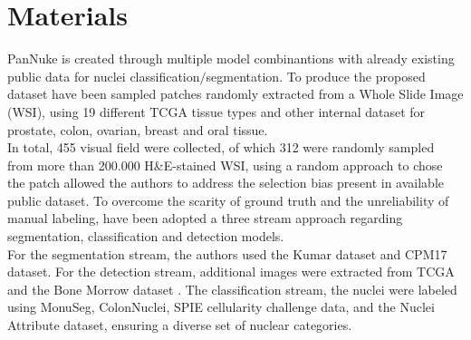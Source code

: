 \documentclass[target=bach,aauheader=,style=]{thud}
\begin{document}
\section{Materials}
PanNuke is created through multiple model combinantions with already existing public data for nuclei classification$/$segmentation. To produce the proposed dataset have been sampled patches randomly extracted from a Whole Slide Image (WSI), using 19 different TCGA tissue types and other internal dataset for prostate, colon, ovarian, breast and oral tissue.\\
In total, 455 visual field were collected, of which 312 were randomly sampled from more than 200.000 H\&E-stained WSI, using a random approach to chose the patch allowed the authors to address the selection bias present in available public dataset. To overcome the scarity of ground truth and the unreliability of manual labeling, have been adopted a three stream approach regarding segmentation, classification and detection models.\\
For the segmentation stream, the authors used the Kumar \cite{article} dataset and CPM17 \cite{vu2018methodssegmentationclassificationdigital} dataset. For the detection stream, additional images were extracted from TCGA and the Bone Morrow \cite{10.1007/978-3-319-24574-4_33} dataset  . The classification stream, the nuclei were labeled using MonuSeg, ColonNuclei, SPIE cellularity challenge data, and the Nuclei Attribute dataset, ensuring a diverse set of nuclear categories.\\

\begin{table}[ht]
\centering
\caption{PanNuke Nuclei Categories from initial datasets. Reproduce from \cite{gamper2020pannuke}}
\label{tab:pannuke_init}
\end{table}
\end{document}
